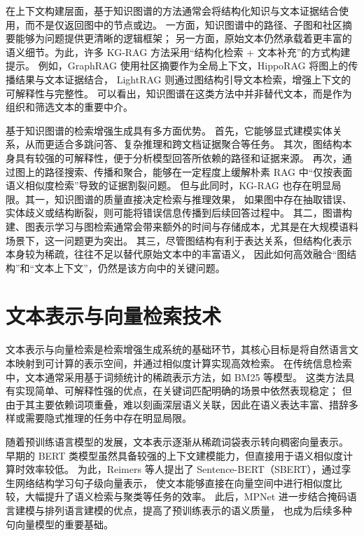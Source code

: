 在上下文构建层面，基于知识图谱的方法通常会将结构化知识与文本证据结合使用，而不是仅返回图中的节点或边。
一方面，知识图谱中的路径、子图和社区摘要能够为问题提供更清晰的逻辑框架；
另一方面，原始文本仍然承载着更丰富的语义细节。为此，许多 KG-RAG 方法采用“结构化检索 + 文本补充”的方式构建提示。
例如，GraphRAG 使用社区摘要作为全局上下文，HippoRAG 将图上的传播结果与文本证据结合，
LightRAG 则通过图结构引导文本检索，增强上下文的可解释性与完整性。
可以看出，知识图谱在这类方法中并非替代文本，而是作为组织和筛选文本的重要中介。

基于知识图谱的检索增强生成具有多方面优势。
首先，它能够显式建模实体关系，从而更适合多跳问答、复杂推理和跨文档证据聚合等任务。
其次，图结构本身具有较强的可解释性，便于分析模型回答所依赖的路径和证据来源。
再次，通过图上的路径搜索、传播和聚合，能够在一定程度上缓解朴素 RAG 中“仅按表面语义相似度检索”导致的证据割裂问题。
但与此同时，KG-RAG 也存在明显局限。其一，知识图谱的质量直接决定检索与推理效果，
如果图中存在抽取错误、实体歧义或结构断裂，则可能将错误信息传播到后续回答过程中。
其二，图谱构建、图表示学习与图检索通常会带来额外的时间与存储成本，尤其是在大规模语料场景下，这一问题更为突出。
其三，尽管图结构有利于表达关系，但结构化表示本身较为稀疏，往往不足以替代原始文本中的丰富语义，
因此如何高效融合“图结构”和“文本上下文”，仍然是该方向中的关键问题。

\section{文本表示与向量检索技术}

文本表示与向量检索是检索增强生成系统的基础环节，其核心目标是将自然语言文本映射到可计算的表示空间，并通过相似度计算实现高效检索。
在传统信息检索中，文本通常采用基于词频统计的稀疏表示方法，如 BM25 等模型。
这类方法具有实现简单、可解释性强的优点，在关键词匹配明确的场景中依然表现稳定；
但由于其主要依赖词项重叠，难以刻画深层语义关联，因此在语义表达丰富、措辞多样或需要隐式推理的任务中存在明显局限。

随着预训练语言模型的发展，文本表示逐渐从稀疏词袋表示转向稠密向量表示。
早期的 BERT\cite{bert} 类模型虽然具备较强的上下文建模能力，但直接用于语义相似度计算时效率较低。
为此，Reimers\cite{reimers2019sentence} 等人提出了 Sentence-BERT（SBERT），通过孪生网络结构学习句子级向量表示，
使文本能够直接在向量空间中进行相似度比较，大幅提升了语义检索与聚类等任务的效率。
此后，MPNet\cite{mpnet} 进一步结合掩码语言建模与排列语言建模的优点，提高了预训练表示的语义质量，
也成为后续多种句向量模型的重要基础。

